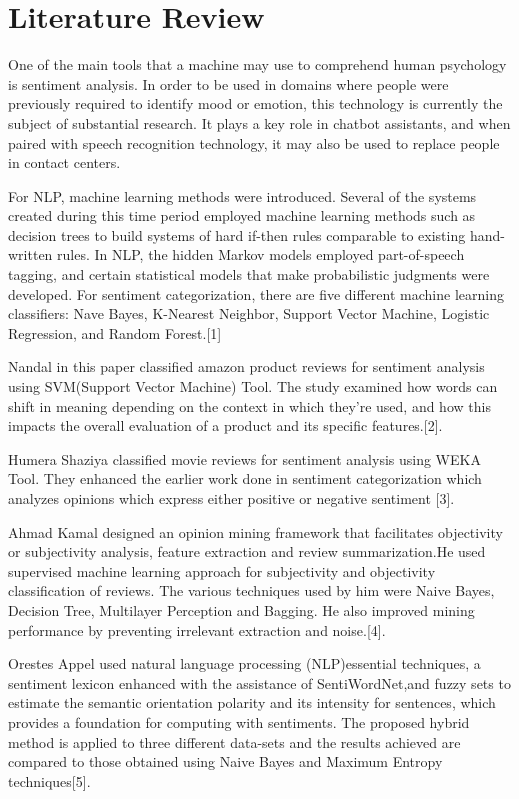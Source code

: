 \section{Literature Review}
One of the main tools that a machine may use to comprehend human psychology is sentiment analysis. In order to be used in domains where people were previously required to identify mood or emotion, this technology is currently the subject of substantial research. It plays a key role in chatbot assistants, and when paired with speech recognition technology, it may also be used to replace people in contact centers. 

\par For NLP, machine learning methods were introduced. Several of the systems created during this time period employed machine learning methods such as decision trees to build systems of hard if-then rules comparable to existing hand-written rules. In NLP, the hidden Markov models employed part-of-speech tagging, and certain statistical models that make probabilistic judgments were developed. For sentiment categorization, there are five different machine learning classifiers: Nave Bayes, K-Nearest Neighbor, Support Vector Machine, Logistic Regression, and Random Forest.[1]

Nandal in this paper classified amazon product reviews for sentiment analysis using SVM(Support Vector Machine) Tool. The study examined how words can shift in meaning depending on the context in which they're used, and how this impacts the overall evaluation of a product and its specific features.[2].

 \par Humera Shaziya classified movie reviews for sentiment analysis using WEKA Tool. They enhanced the earlier work done in sentiment categorization which analyzes opinions which express either positive or negative sentiment
[3].

Ahmad Kamal designed an opinion mining framework that facilitates objectivity or subjectivity analysis, feature extraction and review summarization.He used supervised machine learning approach for subjectivity and objectivity classification of reviews. The various techniques used by him were Naive Bayes, Decision Tree, Multilayer Perception and Bagging. He also improved mining performance by preventing irrelevant extraction and noise.[4].\par

Orestes Appel used natural language processing (NLP)essential techniques, a sentiment lexicon enhanced with the assistance of SentiWordNet,and fuzzy sets to estimate the semantic orientation polarity and its intensity for sentences,
which provides a foundation for computing with sentiments. The proposed hybrid method is applied to three different data-sets and the results achieved are compared to those obtained
using Naive Bayes and Maximum Entropy techniques[5].

